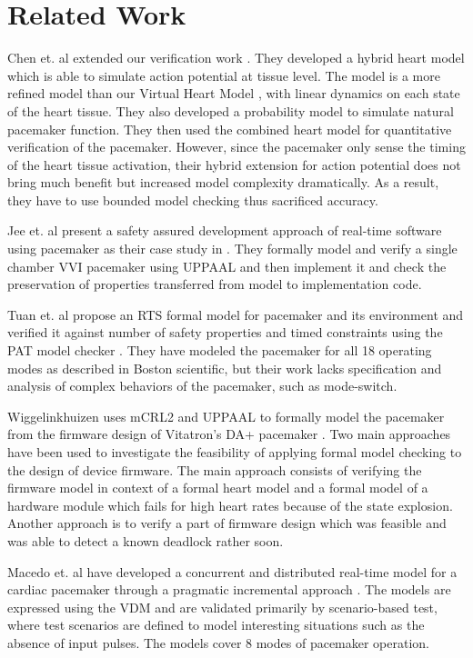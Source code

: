 \section{Related Work}
\vspace{-10pt}
Chen et. al \cite{Marta} extended our verification work \cite{TACAS12}. They developed a hybrid heart model which is able to simulate action potential at tissue level. The model is a more refined model than our Virtual Heart Model \cite{VHM_proc}, with linear dynamics on each state of the heart tissue. They also developed a probability model to simulate natural pacemaker function. They then used the combined heart model for quantitative verification of the pacemaker. However, since the pacemaker only sense the timing of the heart tissue activation, their hybrid extension for action potential does not bring much benefit but increased model complexity dramatically. As a result, they have to use bounded model checking thus sacrificed accuracy.

Jee et. al present a safety assured development approach of real-time software using pacemaker as their case study in \cite{Jee}. They formally model and verify a single chamber VVI pacemaker using UPPAAL and then implement it and check the preservation of properties transferred from model to implementation code. 

Tuan et. al propose an RTS formal model for pacemaker and its environment and verified it against number of safety properties and timed constraints using the PAT model checker \cite{Tuan}. They have modeled the pacemaker for all 18 operating modes as described in Boston scientific, but their work lacks specification and analysis of complex behaviors of the pacemaker, such as mode-switch.

Wiggelinkhuizen uses mCRL2 and UPPAAL to formally model the pacemaker from the firmware design of Vitatron's DA+ pacemaker \cite{Wigg}. Two main approaches have been used to investigate the feasibility of applying formal model checking to the design of device firmware. The main approach consists of verifying the firmware model in context of a formal heart model and a formal model of a hardware module which fails for high heart rates because of the state explosion. Another approach is to verify a part of firmware design which was feasible and was able to detect a known deadlock rather soon.

Macedo et. al have developed a concurrent and distributed real-time model for a cardiac pacemaker through a pragmatic incremental approach \cite{Macedo}. The models are expressed using the VDM and are validated primarily by scenario-based test, where test scenarios are defined to model interesting situations such as the absence of input pulses. The models cover 8 modes of pacemaker operation.

